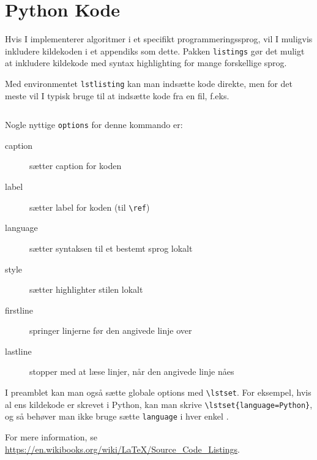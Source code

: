 
\chapter{Python Kode}
\label{app:code}

Hvis I implementerer algoritmer i et specifikt programmeringssprog, vil I muligvis inkludere kildekoden i et appendiks som dette.
Pakken \texttt{listings} gør det muligt at inkludere kildekode med syntax highlighting for mange forskellige sprog.

Med environmentet \texttt{lstlisting} kan man indsætte kode direkte, men for det meste vil I typisk bruge \verb!! til at indsætte kode fra en fil, f.eks.
%
\begin{verbatim}

\end{verbatim}
%
Nogle nyttige \texttt{options} for denne kommando er:
%
\begin{description}
\item[caption] sætter caption for koden
\item[label] sætter label for koden (til \verb!\ref!)
\item[language] sætter syntaksen til et bestemt sprog lokalt
\item[style] sætter highlighter stilen lokalt
\item[firstline] springer linjerne før den angivede linje over 
\item[lastline] stopper med at læse linjer, når den angivede linje nåes
\end{description}
%
I preamblet kan man også sætte globale options med \verb!\lstset!.
For eksempel, hvis al ens kildekode er skrevet i Python, kan man skrive \verb!\lstset{language=Python}!, og så behøver man ikke bruge sætte \texttt{language} i hver enkel \verb!!.



For mere information, se \url{https://en.wikibooks.org/wiki/LaTeX/Source_Code_Listings}.